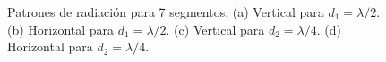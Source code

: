 \documentclass[11pt]{report}
\begin{document}
\begin{figure}[h!]
	\caption{Patrones de radiación para 7 segmentos.
		(a) Vertical para $d_1 =\lambda/2$.
		(b) Horizontal para $d_1=\lambda/2$.
		(c) Vertical para $d_2=\lambda/4$.
		(d) Horizontal para $d_2=\lambda/4$.}
\end{figure}
\end{document}
